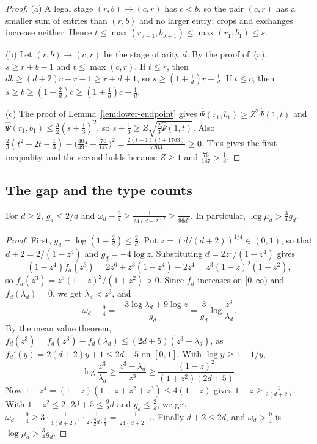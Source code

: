 \begin{proof}
(a) A legal stage \((r,b)\to(c,r)\) has \(c<b\), so the pair \((c,r)\)
has a smaller sum of entries than \((r,b)\) and no larger entry; crops
and exchanges increase neither. Hence
\(t\le\max(r_{J+1},b_{J+1})\le\max(r_1,b_1)\le s\).

(b) Let \((r,b)\to(c,r)\) be the stage of arity \(d\). By the proof
of~(a), \(s\ge r+b-1\) and \(t\le\max(c,r)\). If \(t\le r\), then
\(db\ge(d+2)c+r-1\ge r+d+1\), so \(s\ge(1+\frac1d)r+\frac1d\). If
\(t\le c\), then \(s\ge b\ge(1+\frac2d)c\ge(1+\frac1d)c+\frac1d\).

(c) The proof of Lemma~\ref{lem:lower-endpoint} gives
\(\hat\Psi(r_1,b_1)\ge Z^2\hat\Psi(1,t)\) and
\(\hat\Psi(r_1,b_1)\le\frac32(s+\frac13)^2\), so
\(s+\frac13\ge Z\sqrt{\frac23\hat\Psi(1,t)}\). Also
\(\frac23(t^2+2t-\frac13)-\bigl(\frac{40}{49}t+\frac{76}{147}\bigr)^2
=\frac{2(t-1)(t+1763)}{7203}\ge0\). This gives the first inequality, and
the second holds because \(Z\ge1\) and \(\frac{76}{147}>\frac13\).
\end{proof}

\subsection{The gap and the type counts}
\label{subsec:lower-gap}

\begin{lemma}[Gap]\label{lem:lower-gap}
For \(d\ge2\), \(g_d\le2/d\) and
\(\omega_d-\frac94\ge\frac1{24(d+2)^2}\ge\frac1{96d^2}\). In particular,
\(\log\mu_d>\frac34g_d\).
\end{lemma}

\begin{proof}
First, \(g_d=\log(1+\frac2d)\le\frac2d\). Put
\(z=(d/(d+2))^{1/4}\in(0,1)\), so that \(d+2=2/(1-z^4)\) and
\(g_d=-4\log z\). Substituting \(d=2z^4/(1-z^4)\) gives
\[
 (1-z^4)f_d(z^3)=2z^6+z^3(1-z^4)-2z^4=z^3(1-z)^2(1-z^2),
\]
so \(f_d(z^3)=z^3(1-z)^2/(1+z^2)>0\). Since \(f_d\) increases on
\([0,\infty)\) and \(f_d(\lambda_d)=0\), we get \(\lambda_d<z^3\), and
\[
 \omega_d-\tfrac94=\frac{-3\log\lambda_d+9\log z}{g_d}=\frac3{g_d}\log\frac{z^3}{\lambda_d}.
\]
By the mean value theorem, \(f_d(z^3)=f_d(z^3)-f_d(\lambda_d)\le(2d+5)(z^3-\lambda_d)\),
as \(f_d'(y)=2(d+2)y+1\le2d+5\) on \([0,1]\). With
\(\log y\ge1-1/y\),
\[
 \log\frac{z^3}{\lambda_d}\ge\frac{z^3-\lambda_d}{z^3}
 \ge\frac{(1-z)^2}{(1+z^2)(2d+5)} .
\]
Now \(1-z^4=(1-z)(1+z+z^2+z^3)\le4(1-z)\) gives
\(1-z\ge\frac1{2(d+2)}\). With \(1+z^2\le2\), \(2d+5\le\frac92d\) and
\(g_d\le\frac2d\), we get
\(\omega_d-\frac94\ge3\cdot\frac1{4(d+2)^2}\cdot\frac1{2\cdot\frac92d\cdot\frac2d}=\frac1{24(d+2)^2}\).
Finally \(d+2\le2d\), and \(\omega_d>\frac94\) is
\(\log\mu_d>\frac34g_d\).
\end{proof}

